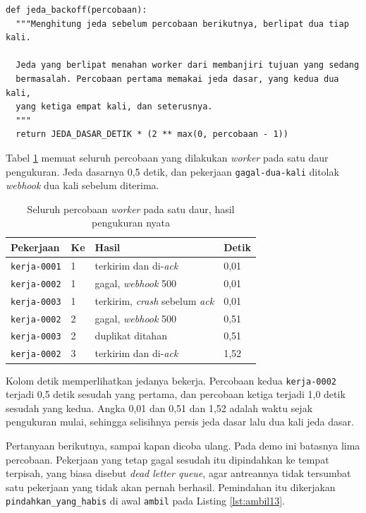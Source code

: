 \begin{lstlisting}[style=PythonStyle, caption={Jeda yang berlipat dua tiap percobaan, tersedia di \berkas{sources/chapter13/antrean.py}}, label={lst:backoff13}]
def jeda_backoff(percobaan):
  """Menghitung jeda sebelum percobaan berikutnya, berlipat dua tiap kali.

  Jeda yang berlipat menahan worker dari membanjiri tujuan yang sedang
  bermasalah. Percobaan pertama memakai jeda dasar, yang kedua dua kali,
  yang ketiga empat kali, dan seterusnya.
  """
  return JEDA_DASAR_DETIK * (2 ** max(0, percobaan - 1))
\end{lstlisting}

Tabel \ref{tab:retry} memuat seluruh percobaan yang dilakukan
\textit{worker} pada satu daur pengukuran. Jeda dasarnya 0,5 detik, dan
pekerjaan \texttt{gagal-dua-kali} ditolak \textit{webhook} dua kali sebelum
diterima.

\begin{table}[!htb]
  \centering
  \caption{Seluruh percobaan \textit{worker} pada satu daur, hasil
           pengukuran nyata}
  \label{tab:retry}
  \begin{tabularx}{\textwidth}{llXl}
    \hline
    \textbf{Pekerjaan} & \textbf{Ke} & \textbf{Hasil} & \textbf{Detik} \\
    \hline
    \texttt{kerja-0001} & 1 & terkirim dan di-\textit{ack} & 0,01 \\
    \hline
    \texttt{kerja-0002} & 1 & gagal, \textit{webhook} 500 & 0,01 \\
    \hline
    \texttt{kerja-0003} & 1 & terkirim, \textit{crash} sebelum \textit{ack} & 0,01 \\
    \hline
    \texttt{kerja-0002} & 2 & gagal, \textit{webhook} 500 & 0,51 \\
    \hline
    \texttt{kerja-0003} & 2 & duplikat ditahan & 0,51 \\
    \hline
    \texttt{kerja-0002} & 3 & terkirim dan di-\textit{ack} & 1,52 \\
    \hline
  \end{tabularx}
\end{table}

Kolom detik memperlihatkan jedanya bekerja. Percobaan kedua
\texttt{kerja-0002} terjadi 0,5 detik sesudah yang pertama, dan percobaan
ketiga terjadi 1,0 detik sesudah yang kedua. Angka 0,01 dan 0,51 dan 1,52
adalah waktu sejak pengukuran mulai, sehingga selisihnya persis jeda dasar
lalu dua kali jeda dasar.

Pertanyaan berikutnya, sampai kapan dicoba ulang. Pada demo ini batasnya
lima percobaan. Pekerjaan yang tetap gagal sesudah itu dipindahkan ke tempat
terpisah, yang biasa disebut \textit{dead letter queue}, agar antreannya
tidak tersumbat satu pekerjaan yang tidak akan pernah berhasil. Pemindahan
itu dikerjakan \texttt{pindahkan\_yang\_habis} di awal \texttt{ambil} pada
Listing \ref{lst:ambil13}.

